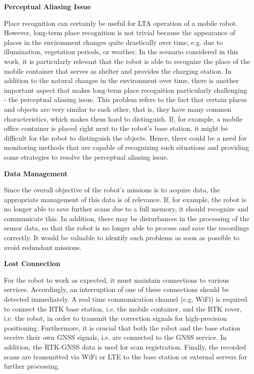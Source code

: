 \documentclass[english, master, utf8]{base/thesis_KBS}
\begin{document}
\noindent
\textbf{Perceptual Aliasing Issue}\newline

\noindent
Place recognition can certainly be useful for LTA operation of a mobile robot. However, long-term place recognition is not trivial because 
the appearance of places in the environment changes quite drastically over time, e.g. due to illumination, vegetation periods, or weather. \cite{Han:2018}
In the scenario considered in this work, it is particularly relevant that the robot is able to recognize the place of the mobile container
that serves as shelter and provides the charging station. In addition to the natural changes in the environment over time, there is another important aspect
that makes long-term place recognition particularly challenging - the perceptual aliasing issue. This problem refers to the fact that certain places and objects are very 
similar to each other, that is, they have many common characteristics, which makes them hard to distinguish. \cite{Han:2018}
If, for example, a mobile office container is placed right next to the robot's base station, it might be difficult for the robot to distinguish the objects.
Hence, there could be a need for monitoring methods that are capable of recognizing such situations and providing some strategies to resolve the perceptual aliasing issue.\newline

\noindent
\textbf{Data Management}\newline

\noindent
Since the overall objective of the robot's missions is to acquire data, the appropriate management of this data is of relevance.
If, for example, the robot is no longer able to save further scans due to a full memory, it should recognize and communicate this.
In addition, there may be disturbances in the processing of the sensor data, so that the robot is no longer able to process and save the recordings correctly.
It would be valuable to identify such problems as soon as possible to avoid redundant missions.\newline

\noindent
\textbf{Lost Connection}\newline

\noindent
For the robot to work as expected, it must maintain connections to various services. Accordingly, an interruption of one of these connections should be detected immediately.
A real time communication channel (e.g. WiFi) is required to connect the RTK base station, i.e. the mobile container, and the RTK rover, i.e. the robot, in order to
transmit the correction signals for high-precision positioning. Furthermore, it is crucial that both the robot and the base station receive their own GNSS signals,
i.e. are connected to the GNSS service. In addition, the RTK-GNSS data is used for scan registration. Finally, the recorded scans are transmitted via WiFi or LTE 
to the base station or external servers for further processing. \newline
\end{document}
